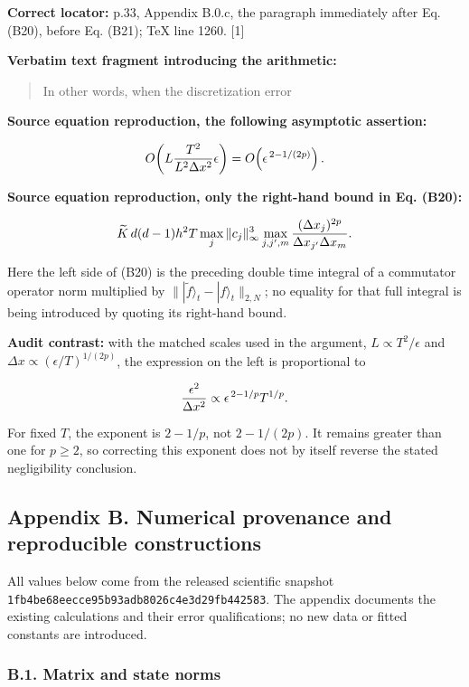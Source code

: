 \textbf{Correct locator:} p.33, Appendix B.0.c, the paragraph
immediately after Eq. (B20), before Eq. (B21); TeX line 1260. {[}1{]}

\textbf{Verbatim text fragment introducing the arithmetic:}

\begin{quote}
In other words, when the discretization error
\end{quote}

\textbf{Source equation reproduction, the following asymptotic
assertion:}

\[
O\!\left(L{T^2\over L^2\Delta x^2}\epsilon\right)
=O\!\left(\epsilon^{\,2-1/(2p)}\right).
\]

\textbf{Source equation reproduction, only the right-hand bound in Eq.
(B20):}

\[
\widetilde K\,d(d-1)h^2T
\max_j\|c_j\|_\infty^3
\max_{j,j',m}{(\Delta x_j)^{2p}\over\Delta x_{j'}\Delta x_m}.
\]

Here the left side of (B20) is the preceding double time integral of a
commutator operator norm multiplied by
\(\||\widetilde f\rangle_t-|f\rangle_t\|_{2,N}\); no equality for that
full integral is being introduced by quoting its right-hand bound.

\textbf{Audit contrast:} with the matched scales used in the argument,
\(L\propto T^2/\epsilon\) and \(\Delta x\propto(\epsilon/T)^{1/(2p)}\),
the expression on the left is proportional to

\[
{\epsilon^2\over\Delta x^2}
\propto\epsilon^{\,2-1/p}T^{1/p}.
\]

For fixed \(T\), the exponent is \(2-1/p\), not \(2-1/(2p)\). It remains
greater than one for \(p\geq2\), so correcting this exponent does not by
itself reverse the stated negligibility conclusion.

\subsection{Appendix B. Numerical provenance and reproducible
constructions}\label{appendix-b.-numerical-provenance-and-reproducible-constructions}

All values below come from the released scientific snapshot
\nolinkurl{1fb4be68eecce95b93adb8026c4e3d29fb442583}. The appendix
documents the existing calculations and their error qualifications; no
new data or fitted constants are introduced.

\subsubsection{B.1. Matrix and state
norms}\label{b.1.-matrix-and-state-norms}


